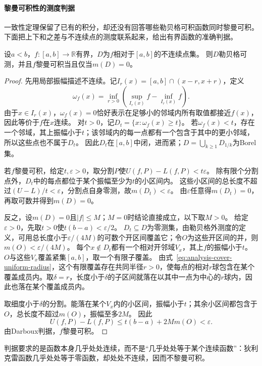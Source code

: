 \paragraph{黎曼可积性的测度判据}
一致性定理保留了已有的积分，却还没有回答哪些勒贝格可积函数同时黎曼可积。
下面把上下和之差与不连续点的测度联系起来，给出有界函数的准确判据。
\begin{theorem}[黎曼可积性的勒贝格判据]
\label{thm:analysis-riemann-lebesgue-criterion}
设$a<b$，$f:[a,b]\to\mathbb R$有界，$D$为$f$相对于$[a,b]$的不连续点集。
则$D$勒贝格可测，并且$f$黎曼可积当且仅当$m(D)=0$。
\end{theorem}
\begin{proof}
先用局部振幅描述不连续。记$I_r(x)=[a,b]\cap(x-r,x+r)$，定义
\[
 \omega_f(x)=\inf_{r>0}\left(\sup_{I_r(x)}f-\inf_{I_r(x)}f\right).
\]
由于$x\in I_r(x)$，$\omega_f(x)=0$恰好表示在足够小的邻域内所有取值都接近$f(x)$，因此等价于$f$在$x$连续。
对$t>0$，记$D_t=\{x:\omega_f(x)\geq t\}$。
若$\omega_f(x)<t$，存在一个邻域，其上振幅小于$t$；该邻域内的每一点都有一个包含于其中的更小邻域，所以这些点也不属于$D_t$。
因此$D_t$在$[a,b]$中闭，进而紧；$D=\bigcup_{k\geq1}D_{1/k}$为Borel集。

若$f$黎曼可积，给定$t,\varepsilon>0$，取分割$P$使$U(f,P)-L(f,P)<t\varepsilon$。
除有限个分割点外，$D_t$中的每点都位于某个振幅至少为$t$的小区间内。
这些小区间的总长度不超过$(U-L)/t<\varepsilon$，分割点自身零测，故$m(D_t)<\varepsilon$。
由$\varepsilon$任意得$m(D_t)=0$，再取可数并得到$m(D)=0$。

反之，设$m(D)=0$且$|f|\leq M$；$M=0$时结论直接成立，以下取$M>0$。
给定$\varepsilon>0$，先取$t>0$使$t(b-a)<\varepsilon/2$。
$D_t\subseteq D$为零测集，由勒贝格外测度的定义，可用总长度小于$\varepsilon/(4M)$的可数个开区间覆盖它；令$O$为这些开区间的并，则$m(O)<\varepsilon/(4M)$。
每个$x\notin D_t$都有一个相对开邻域$V_x$，其上$f$的振幅小于$t$。
$O$与这些$V_x$覆盖紧集$[a,b]$，取一个有限子覆盖。
由式~\eqref{eq:analysis-cover-uniform-radius}，这个有限覆盖存在共同半径$r>0$，使每点的相对$r$球包含在某个覆盖成员内。取$\delta=r$，长度小于$\delta$的子区间就落在以其中一点为中心的$r$球内，因此也落在某个覆盖成员内。

取细度小于$\delta$的分割。能落在某个$V_x$内的小区间，振幅小于$t$；其余小区间都包含于$O$，总长度不超过$m(O)$，振幅至多$2M$。
因此
\[
 U(f,P)-L(f,P)\leq t(b-a)+2M m(O)<\varepsilon.
\]
由Darboux判据，$f$黎曼可积。
\end{proof}
判据要求的是函数本身几乎处处连续，而不是“几乎处处等于某个连续函数”：狄利克雷函数几乎处处等于零函数，却处处不连续，因而不黎曼可积。

